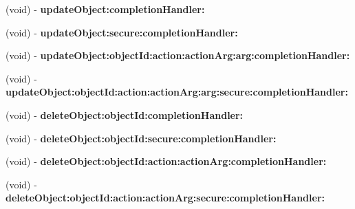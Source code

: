 \begin{DoxyCompactItemize}
\item 
(void) -\/ {\bfseries update\+Object\+:completion\+Handler\+:}\hypertarget{protocol_s_c_service_manager_protocol-p_a0d5fd55a799a245a344946aa2fe2f24c}{}\label{protocol_s_c_service_manager_protocol-p_a0d5fd55a799a245a344946aa2fe2f24c}

\item 
(void) -\/ {\bfseries update\+Object\+:secure\+:completion\+Handler\+:}\hypertarget{protocol_s_c_service_manager_protocol-p_a21a7826174d49f5976360c006c9ad9e3}{}\label{protocol_s_c_service_manager_protocol-p_a21a7826174d49f5976360c006c9ad9e3}

\item 
(void) -\/ {\bfseries update\+Object\+:object\+Id\+:action\+:action\+Arg\+:arg\+:completion\+Handler\+:}\hypertarget{protocol_s_c_service_manager_protocol-p_aea8be494de7afee89ad80dea08c4ce6b}{}\label{protocol_s_c_service_manager_protocol-p_aea8be494de7afee89ad80dea08c4ce6b}

\item 
(void) -\/ {\bfseries update\+Object\+:object\+Id\+:action\+:action\+Arg\+:arg\+:secure\+:completion\+Handler\+:}\hypertarget{protocol_s_c_service_manager_protocol-p_ae5eaeff4770dd3ed7d5bedd9655329e9}{}\label{protocol_s_c_service_manager_protocol-p_ae5eaeff4770dd3ed7d5bedd9655329e9}

\item 
(void) -\/ {\bfseries delete\+Object\+:object\+Id\+:completion\+Handler\+:}\hypertarget{protocol_s_c_service_manager_protocol-p_a665e64ea65fb7fad52d622cc42c09dd2}{}\label{protocol_s_c_service_manager_protocol-p_a665e64ea65fb7fad52d622cc42c09dd2}

\item 
(void) -\/ {\bfseries delete\+Object\+:object\+Id\+:secure\+:completion\+Handler\+:}\hypertarget{protocol_s_c_service_manager_protocol-p_af0645aba5d638e4e85f6d027c961cc10}{}\label{protocol_s_c_service_manager_protocol-p_af0645aba5d638e4e85f6d027c961cc10}

\item 
(void) -\/ {\bfseries delete\+Object\+:object\+Id\+:action\+:action\+Arg\+:completion\+Handler\+:}\hypertarget{protocol_s_c_service_manager_protocol-p_ac71f68bc1e6b5a03c9b9db08144ef854}{}\label{protocol_s_c_service_manager_protocol-p_ac71f68bc1e6b5a03c9b9db08144ef854}

\item 
(void) -\/ {\bfseries delete\+Object\+:object\+Id\+:action\+:action\+Arg\+:secure\+:completion\+Handler\+:}\hypertarget{protocol_s_c_service_manager_protocol-p_affe4e407659a565e749ccea199afa818}{}\label{protocol_s_c_service_manager_protocol-p_affe4e407659a565e749ccea199afa818}


\end{DoxyCompactItemize}
